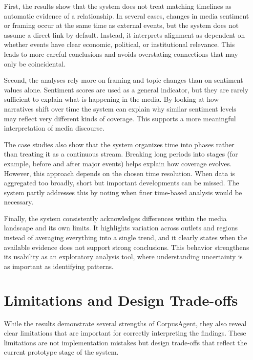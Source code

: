 First, the results show that the system does not treat matching timelines as automatic evidence of a relationship. In several cases, changes in media sentiment or framing occur at the same time as external events, but the system does not assume a direct link by default. Instead, it interprets alignment as dependent on whether events have clear economic, political, or institutional relevance. This leads to more careful conclusions and avoids overstating connections that may only be coincidental.

Second, the analyses rely more on framing and topic changes than on sentiment values alone. Sentiment scores are used as a general indicator, but they are rarely sufficient to explain what is happening in the media. By looking at how narratives shift over time the system can explain why similar sentiment levels may reflect very different kinds of coverage. This supports a more meaningful interpretation of media discourse.

The case studies also show that the system organizes time into phases rather than treating it as a continuous stream. Breaking long periods into stages (for example, before and after major events) helps explain how coverage evolves. However, this approach depends on the chosen time resolution. When data is aggregated too broadly, short but important developments can be missed. The system partly addresses this by noting when finer time-based analysis would be necessary.

Finally, the system consistently acknowledges differences within the media landscape and its own limits. It highlights variation across outlets and regions instead of averaging everything into a single trend, and it clearly states when the available evidence does not support strong conclusions. This behavior strengthens its usability as an exploratory analysis tool, where understanding uncertainty is as important as identifying patterns.


\section{Limitations and Design Trade-offs}

While the results demonstrate several strengths of CorpusAgent, they also reveal clear limitations that are important for correctly interpreting the findings. These limitations are not implementation mistakes but design trade-offs that reflect the current prototype stage of the system.

